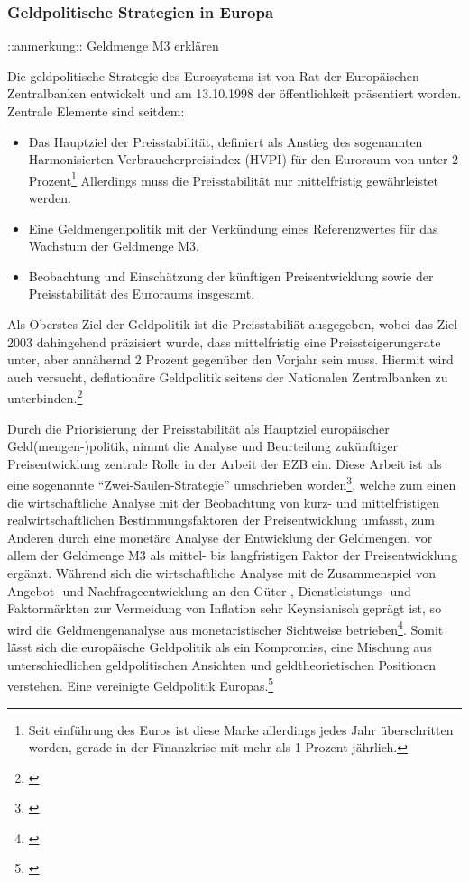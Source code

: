\documentclass[
        onecolumn,
        a4paper,
        abstracton,
        parskip=half
        ,final
        ]{scrartcl}
\begin{document}
\subsubsection{Geldpolitische Strategien in Europa}
::anmerkung:: Geldmenge M3 erkl{\"a}ren

Die geldpolitische Strategie des Eurosystems ist von Rat der Europ{\"a}ischen Zentralbanken entwickelt und am 13.10.1998 der {\"o}ffentlichkeit pr{\"a}sentiert worden.
Zentrale Elemente sind seitdem:
\begin{itemize}
 \item Das Hauptziel der Preisstabilit{\"a}t, definiert als Anstieg des sogenannten Harmonisierten Verbraucherpreisindex (HVPI) f{\"u}r den Euroraum von unter 2 Prozent\footnote[78]{Seit einf{\"u}hrung des Euros ist diese Marke allerdings jedes Jahr {\"u}berschritten worden, gerade in der Finanzkrise mit mehr als 1 Prozent j{\"a}hrlich.} Allerdings muss die Preisstabilit{\"a}t nur mittelfristig gew{\"a}hrleistet werden.
 \item Eine Geldmengenpolitik mit der Verk{\"u}ndung eines Referenzwertes f{\"u}r das Wachstum der Geldmenge M3,
 \item Beobachtung und Einsch{\"a}tzung der k{\"u}nftigen Preisentwicklung sowie der Preisstabilit{\"a}t des Euroraums insgesamt.
\end{itemize}
Als Oberstes Ziel der Geldpolitik ist die Preisstabili{\"a}t ausgegeben, wobei das Ziel 2003 dahingehend pr{\"a}zisiert wurde, dass mittelfristig eine Preissteigerungsrate unter, aber ann{\"a}hernd 2 Prozent gegen{\"u}ber den Vorjahr sein muss. Hiermit wird auch versucht, deflation{\"a}re Geldpolitik seitens der Nationalen Zentralbanken zu unterbinden.\footnote[101]{\citep[vgl.][S.564-568]{Basseler2010}}

Durch die Priorisierung der Preisstabilit{\"a}t als Hauptziel europ{\"a}ischer Geld(mengen-)politik, nimmt die Analyse und Beurteilung zuk{\"u}nftiger Preisentwicklung zentrale Rolle in der Arbeit der EZB ein. Diese Arbeit ist als eine sogenannte "`Zwei-S{\"a}ulen-Strategie"' umschrieben worden\footnote[95]{\citep[S.568]{Basseler2010}}, welche zum einen die wirtschaftliche Analyse mit der Beobachtung von kurz- und mittelfristigen realwirtschaftlichen Bestimmungsfaktoren der Preisentwicklung umfasst,
zum Anderen durch eine monet{\"a}re Analyse der Entwicklung der Geldmengen, vor allem der Geldmenge M3 als mittel- bis langfristigen Faktor der Preisentwicklung erg{\"a}nzt.
W{\"a}hrend sich die wirtschaftliche Analyse mit de Zusammenspiel von Angebot- und Nachfrageentwicklung an den G{\"u}ter-, Dienstleistungs- und Faktorm{\"a}rkten zur Vermeidung von Inflation sehr Keynsianisch gepr{\"a}gt ist, so wird die Geldmengenanalyse aus monetaristischer Sichtweise betrieben\footnote[97]{\citep[S.568]{Basseler2010}}. Somit l{\"a}sst sich die europ{\"a}ische Geldpolitik als ein Kompromiss, eine Mischung aus unterschiedlichen geldpolitischen Ansichten und geldtheorietischen Positionen verstehen. Eine vereinigte Geldpolitik Europas.\footnote[99]{\citep[vgl.][S.558f]{Basseler2010}}
\end{document}
